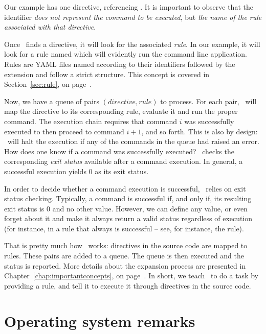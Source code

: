 Our example has one directive, referencing . It is important to observe that the  identifier \emph{does not represent the command to be executed}, but \emph{the name of the rule associated with that directive}.

Once \arara\ finds a directive, it will look for the associated \emph{rule}. In our example, it will look for a rule named  which will evidently run the  command line application. Rules are YAML files named according to their identifiers followed by the  extension and follow a strict structure. This concept is covered in Section~\ref{sec:rule}, on page~\pageref{sec:rule}.

Now, we have a queue of pairs $(\textit{directive}, \textit{rule})$ to process. For each pair, \arara\ will map the directive to its corresponding rule, evaluate it and run the proper command. The execution chain requires that command $i$ was successfully executed to then proceed to command $i+1$, and so forth. This is also by design: \arara\ will halt the execution if any of the commands in the queue had raised an error. How does one know if a command was successfully executed? \arara\ checks the corresponding \emph{exit status} available after a command execution. In general, a successful execution yields 0 as its exit status.

In order to decide whether a command execution is successful, \arara\ relies on exit status checking. Typically, a command is successful if, and only if, its resulting exit status is 0 and no other value. However, we can define any value, or even forget about it and make it always return a valid status regardless of execution (for instance, in a rule that always is successful -- see, for instance, the   rule).

That is pretty much how \arara\ works: directives in the source code are mapped to rules. These pairs are added to a queue. The queue is then executed and the status is reported. More details about the expansion process are presented in Chapter~\ref{chap:importantconcepts}, on page~\pageref{chap:importantconcepts}. In short, we teach \arara\ to do a task by providing a rule, and tell it to execute it through directives in the source code.

\section{Operating system remarks}
\label{sec:operatingsystemremarks}

